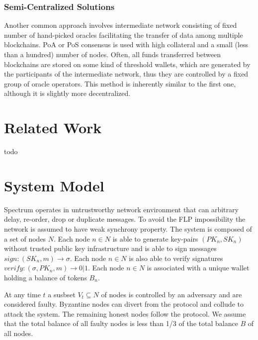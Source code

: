 \documentclass{article}
\begin{document}
    \subsubsection{Semi-Centralized Solutions}\label{subsubsec:semi-centralized-solutions}

    Another common approach involves intermediate network consisting of fixed number of hand-picked oracles facilitating the transfer of data among multiple blockchains.
    PoA or PoS consensus is used with high collateral and a small (less than a hundred) number of nodes.
    Often, all funds transferred between blockchains are stored on some kind of threshold wallets, which are generated by the participants of the intermediate network, thus they are controlled by a fixed group of oracle operators.
    This method is inherently similar to the first one, although it is slightly more decentralized.


    \section{Related Work}\label{sec:related-work}

    todo


    \section{System Model}\label{sec:system-model}

    Spectrum operates in untrustworthy network environment that can arbitrary delay, re-order, drop or duplicate messages.
    To avoid the FLP impossibility the network is assumed to have weak synchrony property.
    The system is composed of a set of nodes $N$.
    Each node $n \in N$ is able to generate key-pairs $(PK_n, SK_n)$ without trusted public key infrastructure and is able to sign messages $sign: (SK_n, m) \rightarrow \sigma$.
    Each node $n \in N$ is also able to verify signatures $verify: (\sigma, PK_n, m) \rightarrow 0 | 1$.
    Each node $n \in N$ is associated with a unique wallet holding a balance of tokens $B_n$.

    At any time $t$ a susbset $V_t \subseteq N$ of nodes is controlled by an adversary and are considered faulty.
    Byzantine nodes can divert from the protocol and collude to attack the system.
    The remaining honest nodes follow the protocol.
    We assume that the total balance of all faulty nodes is less than 1/3 of the total balance $B$ of all nodes.
\end{document}
